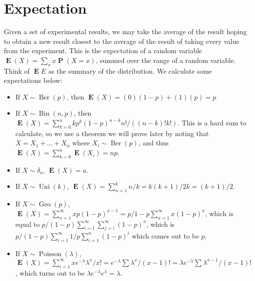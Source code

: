 \documentclass{report}
\DeclareMathOperator{\prob}{\mathbf{P}}
\DeclareMathOperator{\Ber}{Ber}
\DeclareMathOperator{\Bin}{Bin}
\DeclareMathOperator{\Geo}{Geo}
\DeclareMathOperator{\Poisson}{Poisson}
\DeclareMathOperator{\Uni}{Uni}
\DeclareMathOperator{\expect}{\mathbf{E}}
\begin{document}
\section{Expectation}

Given a set of experimental results, we may take the average of the result hoping to obtain a new result closest to the average of the result of taking every value from the experiment. This is the expectation of a random variable $\expect(X) = \sum_x x \prob(X = x)$, summed over the range of a random variable. Think of $\expect{E}$ as the summary of the distribution. We calculate some expectations below:

\begin{itemize}
    \item If $X \sim \Ber(p)$, then $\expect(X) = (0)(1-p) + (1)(p) = p$
    \item If $X \sim \Bin(n,p)$, then $\expect(X) = \sum_{k=0}^n k p^k(1-p)^{n-k} n!/((n-k)! k!)$. This is a hard sum to calculate, so we use a theorem we will prove later by noting that $X = X_1 + \dots + X_n$ where $X_i \sim \Ber(p)$, and thus $\expect(X) = \sum_{k=0}^n \expect(X_i) = np$.
    \item If $X \sim \delta_a$, $\expect(X) = a$.
    \item If $X \sim \Uni(k)$, $\expect(X) = \sum_{n=1}^k n/k = k(k+1)/2k = (k+1)/2$.
    \item If $X \sim \Geo(p)$, $\expect(X) = \sum_{x=1}^\infty xp(1-p)^{x-1} = p/1-p \sum_{x=1}^\infty x(1-p)^x$, which is equal to $p/(1-p) \sum_{i=1}^\infty \sum_{j = i}^\infty (1-p)^x$, which is $p/(1-p) \sum_{i=1}^\infty 1/p \sum_{i = 1}^n (1-p)^i$ which comes out to be $p$.
    \item If $X \sim \Poisson(\lambda)$, $\expect(X) = \sum_{i=1}^\infty xe^{-\lambda}\lambda^x/x! = e^{-\lambda} \sum \lambda^x/(x-1)! = \lambda e^{-\lambda} \sum \lambda^{x-1}/(x-1)!$, which turns out to be $\lambda e^{-\lambda} e^{\lambda} = \lambda$.
\end{itemize}
\end{document}
